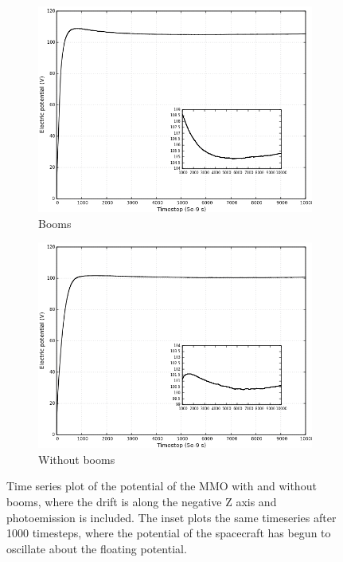 \begin{figure}[H]
  \centering
  \begin{subfigure}[b]{0.75\textwidth}
  \includegraphics[width=\columnwidth]{figures/MMO/minZ/WB/C_minZ_WB.png}
  \caption{Booms}
  \label{fig:C_minZ_WB}
\end{subfigure}
\par\bigskip
\begin{subfigure}[b]{0.75\textwidth}
  \includegraphics[width=\columnwidth]{figures/MMO/minZ/NB/C_minZ_NB.png}
  \caption{Without booms}
  \label{fig:C_minZ_NB}
\end{subfigure}
\caption{Time series plot of the potential of the MMO with and without booms, where the drift is along the negative Z axis and photoemission is included. The inset plots the same timeseries after 1000 timesteps, where the potential of the spacecraft has begun to oscillate about the floating potential.}
\label{fig:Conv_minZ}
\end{figure}

